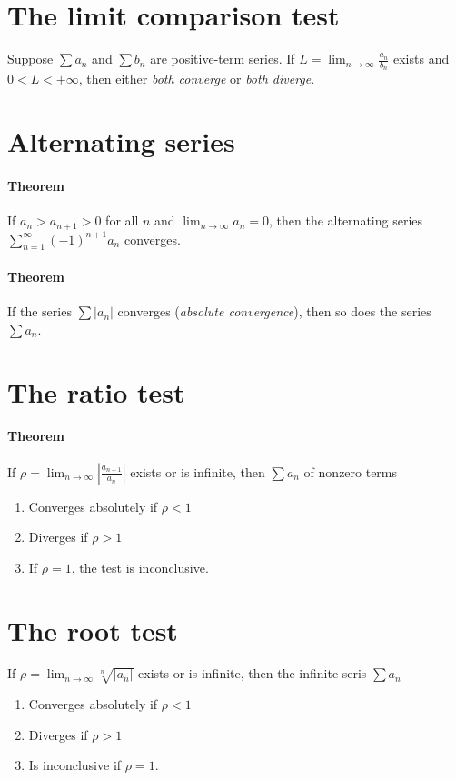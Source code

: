 \documentclass[a4paper,twocolumn,10pt]{article}
\begin{document}
  \section*{The limit comparison test}
  Suppose $\sum a_n$ and $\sum b_n$ are positive-term series. If $L =
  \lim_{n\to\infty}{\frac{a_n}{b_n}}$ exists and $0<L<+\infty$, then either
  \textit{both converge} or \textit{both diverge}.

  \section*{Alternating series}
  \paragraph{Theorem}
  If $a_n > a_{n+1} > 0$ for all $n$ and $\lim_{n\to\infty}{a_n} = 0$, then the
  alternating series $\sum_{n=1}^{\infty} (-1)^{n+1} a_n$ converges.

  \paragraph{Theorem}
  If the series $\sum|a_n|$ converges (\textit{absolute convergence}), then so
  does the series $\sum a_n$.

  \section*{The ratio test}
  \paragraph{Theorem} If $\rho = \lim_{n\to\infty}|\frac{a_{n+1}}{a_n}|$ exists
  or is infinite, then $\sum a_n$ of nonzero terms 
  \begin{enumerate}
    \item Converges absolutely if $\rho < 1$
    \item Diverges if $\rho > 1$
    \item If $\rho = 1$, the test is inconclusive.
  \end{enumerate}

  \section*{The root test}
  If $\rho = \lim_{n\to\infty}{\sqrt[n]{|a_n|}}$ exists or is infinite, then the
  infinite seris $\sum a_n$
  \begin{enumerate}
    \item Converges absolutely if $\rho < 1$
    \item Diverges if $\rho > 1$
    \item Is inconclusive if $\rho = 1$.
  \end{enumerate}
\end{document}
